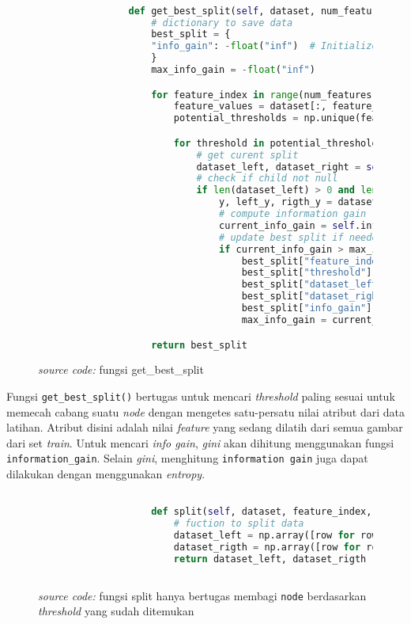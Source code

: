 		\begin{figure}[H]
			\begin{lstlisting}[language=Python, basicstyle=\tiny]

				def get_best_split(self, dataset, num_features):
					# dictionary to save data
					best_split = {
					"info_gain": -float("inf")  # Initialize info_gain to a very small value
					} 
					max_info_gain = -float("inf")

					for feature_index in range(num_features):
						feature_values = dataset[:, feature_index]
						potential_thresholds = np.unique(feature_values)

						for threshold in potential_thresholds:
							# get curent split
							dataset_left, dataset_right = self.split(dataset, feature_index, threshold)
							# check if child not null
							if len(dataset_left) > 0 and len(dataset_right) > 0:
								y, left_y, rigth_y = dataset[:,-1], dataset_left[:,-1], dataset_right[:, -1]
								# compute information gain
								current_info_gain = self.information_gain(y, left_y, rigth_y, "gini")
								# update best split if needed
								if current_info_gain > max_info_gain:
									best_split["feature_index"] = feature_index
									best_split["threshold"] = threshold
									best_split["dataset_left"] = dataset_left
									best_split["dataset_right"] = dataset_right
									best_split["info_gain"] = current_info_gain
									max_info_gain = current_info_gain

        			return best_split

			\end{lstlisting}
			\caption{\emph{source code:} fungsi get\_best\_split}
			\label{code: get split function}
		\end{figure}

		Fungsi \texttt{get\_best\_split()} bertugas untuk mencari \textit{threshold} paling sesuai 
		untuk memecah cabang suatu \textit{node} dengan mengetes satu-persatu nilai 
		atribut dari data latihan. Atribut disini adalah nilai \textit{feature} yang sedang dilatih 
		dari semua gambar dari set \textit{train}. Untuk mencari \textit{info gain}, \textit{gini} 
		akan dihitung menggunakan fungsi \texttt{information\_gain}. Selain \textit{gini}, 
		menghitung \texttt{information gain} juga dapat dilakukan dengan menggunakan \textit{entropy}.

		\begin{figure}[H]
			\begin{lstlisting}[language=Python, basicstyle=\tiny]

					def split(self, dataset, feature_index, threshold):
						# fuction to split data 
						dataset_left = np.array([row for row in dataset if row[feature_index] <= threshold])
						dataset_rigth = np.array([row for row in dataset if row[feature_index] > threshold])
						return dataset_left, dataset_rigth
			
			\end{lstlisting}
			\caption{\emph{source code:} fungsi split hanya bertugas membagi \texttt{node} 
			berdasarkan \textit{threshold} yang sudah ditemukan}
			\label{code: split function}
		\end{figure}

